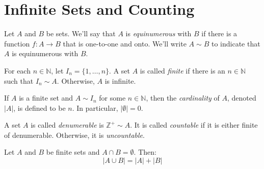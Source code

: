 \documentclass[nobib,notoc]{tufte-handout}
\begin{document}
\section{Infinite Sets and Counting}
\begin{defi}[Equinumerous]
Let \(A\) and \(B\) be sets. We'll say that \(A\) is \emph{equinumerous} with \(B\) if there is a function \(f:A\rightarrow B\) that is one-to-one and onto. We'll write \(A\sim B\) to indicate that \(A\) is equinumerous with \(B\).
\end{defi}
\begin{defi}[Finite]
	For each \(n\in\mathbb{N}\), let \(I_n=\{1,\ldots,n\}\). A set \(A\) is called \emph{finite} if there is an \(n\in\mathbb{N}\) such that \(I_n\sim A\). Otherwise, \(A\) is infinite.
\end{defi}
\begin{defi}[Cardinality]
If \(A\) is a finite set and \(A\sim I_n\) for some \(n\in\mathbb{N}\), then the \emph{cardinality} of \(A\), denoted \(\lvert A\rvert\), is defined to be \(n\). In particular, \(\lvert\emptyset\rvert=0\).
\end{defi}
\begin{defi}[Denumerable]
	A set \(A\) is called \emph{denumerable} is \(\mathbb{Z}^+\sim A\). It is called \emph{countable} if it is either finite of denumerable. Otherwise, it is \emph{uncountable}.
\end{defi}
\begin{cor}
	Let \(A\) and \(B\) be finite sets and \(A\cap B=\emptyset\). Then:
	\begin{equation*}
		\lvert A\cup B\rvert=\lvert A\rvert+\lvert B\rvert
	\end{equation*}
\end{cor}
\end{document}

